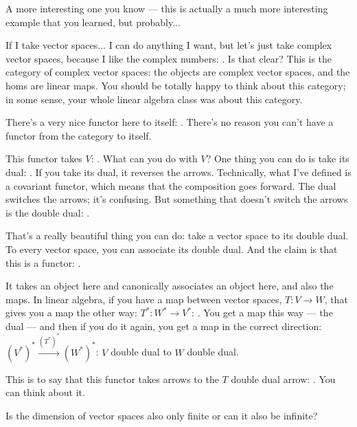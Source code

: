 \begin{speech}[01:27:44 - 01:30:03]
A more interesting one you know --- this is actually a much more interesting example that you learned, but probably...

If I take vector spaces... I can do anything I want, but let's just take complex vector spaces, because I like the complex numbers: . Is that clear? This is the category of complex vector spaces: the objects are complex vector spaces, and the homs are linear maps. You should be totally happy to think about this category; in some sense, your whole linear algebra class was about this category.

There's a very nice functor here to itself: . There's no reason you can't have a functor from the category to itself.

This functor takes $V$: . What can you do with $V$? One thing you can do is take its dual: . If you take its dual, it reverses the arrows. Technically, what I've defined is a covariant functor, which means that the composition goes forward. The dual switches the arrows; it's confusing. But something that doesn't switch the arrows is the double dual: .

That's a really beautiful thing you can do: take a vector space to its double dual. To every vector space, you can associate its double dual. And the claim is that this is a functor: .

It takes an object here and canonically associates an object here, and also the maps. In linear algebra, if you have a map between vector spaces, $T \colon V \to W$,  that gives you a map the other way: $T^* \colon W^* \to V^*$: . You get a map this way --- the dual --- and then if you do it again, you get a map in the correct direction: $(V^*)^* \xrightarrow{(T^*)^*} (W^*)^*$:  $V$ double dual to $W$ double dual.

This is to say that this functor takes arrows to the $T$ double dual arrow: . You can think about it.
\end{speech}

\begin{student}
Is the dimension of vector spaces also only finite or can it also be infinite?
\end{student}

